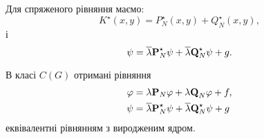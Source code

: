 Для спряженого рівняння маємо:
\begin{equation}
	K^\star (x, y) = P_N^\star (x, y) + Q_N^\star (x, y),
\end{equation}
і
\begin{equation}
	\psi = \overline \lambda \bf{P}_N^\star  \psi + \overline \lambda \bf{Q}_N^\star  \psi + g.
\end{equation}

\begin{proposition}
	В класі $C(G)$ отримані рівняння
	\begin{align}
		\phi &= \lambda \bf{P}_N \phi + \lambda \bf{Q}_N \phi + f, \\
		\psi &= \overline \lambda \bf{P}_N^\star  \psi + \overline \lambda \bf{Q}_N^\star  \psi + g
	\end{align}
	еквівалентні рівнянням з виродженим ядром. 
\end{proposition}

